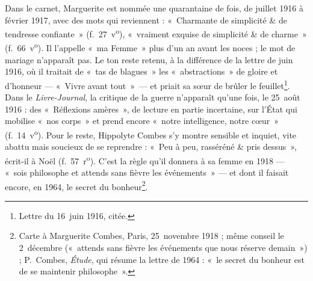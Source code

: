 Dans le carnet, Marguerite est nommée une quarantaine de fois, de juillet 1916 à février 1917, avec des mots qui reviennent : «~Charmante de simplicité \& de tendresse confiante~» (f.~27~v\textsuperscript{o}), «~vraiment exquise de simplicité \& de charme~» (f.~66~v\textsuperscript{o}). Il l'appelle «~ma Femme~» plus d'un an avant les noces ; le mot de mariage n'apparaît pas. Le ton reste retenu, à la différence de la lettre de juin 1916, où il traitait de «~tas de blagues~» les «~abstractions~» de gloire et d'honneur --- «~Vivre avant tout~»~--- et priait sa sœur de brûler le feuillet\footnote{Lettre du 16~juin 1916, citée.}. Dans le \textit{Livre-Journal}, la critique de la guerre n'apparaît qu'une fois, le 25~août 1916 : des «~Réflexions amères~», de lecture en partie incertaine, sur l'État qui mobilise «~nos corps~» et prend encore «~notre intelligence, notre cœur~» (f.~14~v\textsuperscript{o}). Pour le reste, Hippolyte Combes s'y montre sensible et inquiet, vite abattu mais soucieux de se reprendre : «~Peu à peu, rasséréné \& pris dessus~», écrit-il à Noël (f.~57~r\textsuperscript{o}). C'est la règle qu'il donnera à sa femme en 1918 --- «~sois philosophe et attends sans fièvre les événements~» --- et dont il faisait encore, en 1964, le secret du bonheur\footnote{Carte à Marguerite Combes, Paris, 25~novembre 1918 ; même conseil le 2~décembre («~attends sans fièvre les événements que nous réserve demain~») ; P.~Combes, \textit{Étude}, qui résume la lettre de 1964 : «~le secret du bonheur est de se maintenir philosophe~».}.
